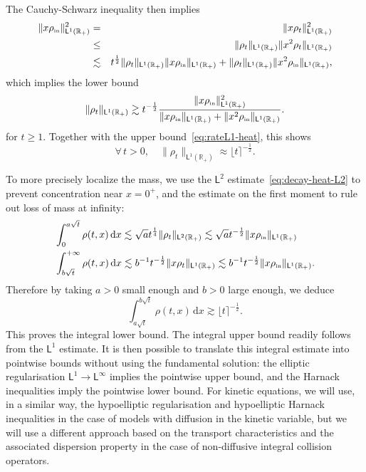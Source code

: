 \documentclass[11pt]{amsart}
\theoremstyle{definition}
\theoremstyle{remark}
\numberwithin{equation}{section}
\newcommand\R{{\mathbb R}}
\newcommand{\dd}{{\, \mathrm d}}
\newcommand{\init}{\text{{\tiny {\rm in}}}}
\newcommand{\sfL}{\mathsf{L}}
\newcommand{\wangle}[1]{\lfloor #1 \rceil}
\begin{document}
The Cauchy-Schwarz inequality then implies
\begin{eqnarray*}
  \| x \rho_\init \|^2 _{\sfL^{1}(\R_+)}
  &=& \| x \rho_t \|^2 _{\sfL^{1}(\R_+)} \\
  &\le& \| \rho_t \|_{\sfL^{1}(\R_+)} \| x^2 \rho_t \|_{\sfL^{1}(\R_+)} \\
  &\lesssim& t^{\frac12} \| \rho_t \|_{\sfL^{1}(\R_+)}  \| x \rho_\init \|_{\sfL^{1}(\R_+)} + \| \rho_t \|_{\sfL^{1}(\R_+)}  \| x^2 \rho_{\init} \|_{\sfL^{1}(\R_+)},
\end{eqnarray*}
which implies the lower bound
\begin{equation}
  \label{eq:heat-rho-estimate-from-below}
  \| \rho_t \|_{\sfL^{1}(\R_+)} \gtrsim t^{-\frac12} \frac{\| x \rho_\init \|^2 _{\sfL^{1}(\R_+)}}{\| x \rho_\init \|_{\sfL^{1}(\R_+)} + \| x^2 \rho_{\init} \|_{\sfL^{1}(\R_+)}}.
\end{equation}
for $t \ge 1$. Together with the upper bound~\eqref{eq:rateL1-heat}, this shows
\begin{equation*}
  \forall \, t >0, \quad \| \rho_t \|_{\sfL^{1}(\R_+)} \approx \wangle{t}^{-\frac{1}{2}}.
\end{equation*}

To more precisely localize the mass, we use the $\sfL^{2}$ estimate~\eqref{eq:decay-heat-L2} to prevent concentration near $x = 0^+$, and the estimate on the first moment to rule out loss of mass at infinity:
\begin{align*}
  & \int_0 ^{a \sqrt{t}} \rho(t,x) \dd x \lesssim \sqrt{a} t^{\frac14} \| \rho_t\|_{\sfL^{2}(\R_+)} \lesssim \sqrt{a} t^{-\frac12} \| x \rho_\init \|_{\sfL^{1}(\R_+)} \\
  & \int_{b \sqrt{t}} ^{+\infty} \rho(t,x) \dd x \lesssim b^{-1} t^{-\frac12} \| x \rho_t \|_{\sfL^{1}(\R_+)} \lesssim b^{-1} t^{-\frac12} \| x \rho_\init \|_{\sfL^{1}(\R_+)}.
\end{align*}
Therefore by taking $a>0$ small enough and $b>0$ large enough, we deduce
\begin{equation*}
  \int_{a \sqrt{t}} ^{b\sqrt{t}} \rho(t,x) \dd x \gtrsim \wangle{t}^{-\frac12}.
\end{equation*}
This proves the integral lower bound. The integral upper bound readily follows from the $\sfL^{1}$ estimate. It is then possible to translate this integral estimate into pointwise bounds without using the fundamental solution: the elliptic regularisation $\sfL^{1} \to \sfL^{\infty}$ implies the pointwise upper bound, and the Harnack inequalities imply the pointwise lower bound. For kinetic equations, we will use, in a similar way, the  hypoelliptic regularisation and hypoelliptic Harnack inequalities in the case of models with diffusion in the kinetic variable, but we will use a different approach based on the transport characteristics and the associated dispersion property in the case of non-diffusive integral collision operators.
\end{document}
